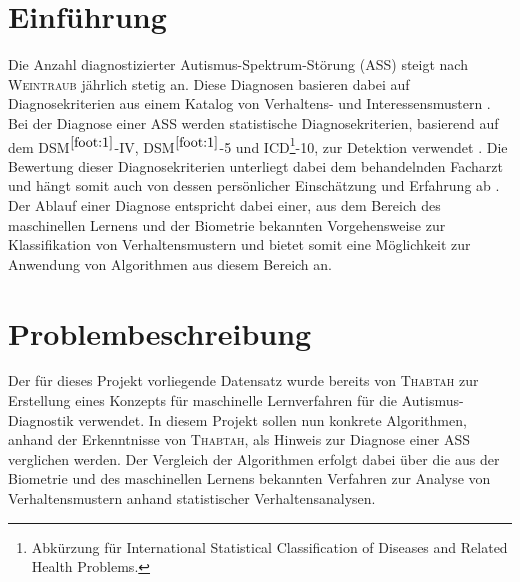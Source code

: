\section{Einführung}
Die Anzahl diagnostizierter Autismus-Spektrum-Störung (ASS) steigt nach \textsc{Weintraub} \cite{Weintraub2011} jährlich stetig an. Diese Diagnosen basieren dabei auf Diagnosekriterien aus einem Katalog von Verhaltens- und Interessensmustern \cite{Weintraub2011, Thabtah2017, Thabtah2018, VanElst2014}. Bei der Diagnose einer ASS werden statistische Diagnosekriterien, basierend auf dem DSM$^{\ref{foot:1}}$-IV, DSM$^{\ref{foot:1}}$-5 und ICD\footnote{\label{foot:2}Abkürzung für \glqq International Statistical Classification of Diseases and Related Health Problems\grqq{}.}-10, zur Detektion verwendet \cite{Thabtah2017, VanElst2014}. Die Bewertung dieser Diagnosekriterien unterliegt dabei dem behandelnden Facharzt und hängt somit auch von dessen persönlicher Einschätzung und Erfahrung ab \cite{VanElst2014}. Der Ablauf einer Diagnose entspricht dabei einer, aus dem Bereich des maschinellen Lernens und der Biometrie bekannten Vorgehensweise zur Klassifikation von Verhaltensmustern und bietet somit eine Möglichkeit zur Anwendung von Algorithmen aus diesem Bereich an.

\section{Problembeschreibung}
Der für dieses Projekt vorliegende Datensatz wurde bereits von \textsc{Thabtah} \cite{Thabtah2017, Thabtah2018} zur Erstellung eines Konzepts für maschinelle Lernverfahren für die Autismus-Diagnostik verwendet.
In diesem Projekt sollen nun konkrete Algorithmen, anhand der Erkenntnisse von \textsc{Thabtah}, als Hinweis zur Diagnose einer ASS verglichen werden. %
Der Vergleich der Algorithmen erfolgt dabei über die aus der Biometrie und des maschinellen Lernens bekannten Verfahren zur Analyse von Verhaltensmustern anhand statistischer Verhaltensanalysen.